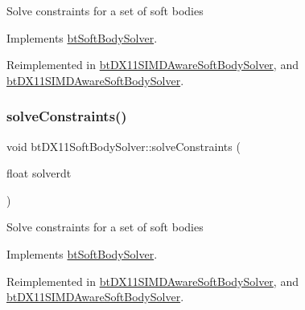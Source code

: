 Solve constraints for a set of soft bodies 

Implements \hyperlink{classbtSoftBodySolver_a5e71a2a32786574bedf409ba822980eb}{bt\+Soft\+Body\+Solver}.



Reimplemented in \hyperlink{classbtDX11SIMDAwareSoftBodySolver_ae78972e067e72a8b5cb51ad05def50df}{bt\+D\+X11\+S\+I\+M\+D\+Aware\+Soft\+Body\+Solver}, and \hyperlink{classbtDX11SIMDAwareSoftBodySolver_a952ce0e7cf089b1eee2db1f75319ec27}{bt\+D\+X11\+S\+I\+M\+D\+Aware\+Soft\+Body\+Solver}.

\mbox{\label{classbtDX11SoftBodySolver_ab6477819156cdc0f5850514683b77f08}} 
\subsubsection{\texorpdfstring{solve\+Constraints()}{solveConstraints()}\hspace{0.1cm}{\footnotesize\ttfamily [2/2]}}
{\footnotesize\ttfamily void bt\+D\+X11\+Soft\+Body\+Solver\+::solve\+Constraints (\begin{DoxyParamCaption}\item[{float}]{solverdt }\end{DoxyParamCaption})\hspace{0.3cm}{\ttfamily [virtual]}}

Solve constraints for a set of soft bodies 

Implements \hyperlink{classbtSoftBodySolver_a5e71a2a32786574bedf409ba822980eb}{bt\+Soft\+Body\+Solver}.



Reimplemented in \hyperlink{classbtDX11SIMDAwareSoftBodySolver_ae78972e067e72a8b5cb51ad05def50df}{bt\+D\+X11\+S\+I\+M\+D\+Aware\+Soft\+Body\+Solver}, and \hyperlink{classbtDX11SIMDAwareSoftBodySolver_a952ce0e7cf089b1eee2db1f75319ec27}{bt\+D\+X11\+S\+I\+M\+D\+Aware\+Soft\+Body\+Solver}.

\mbox{\label{classbtDX11SoftBodySolver_a2b96a99eb97d2ae1fc9235bba8cb70ce}} 
